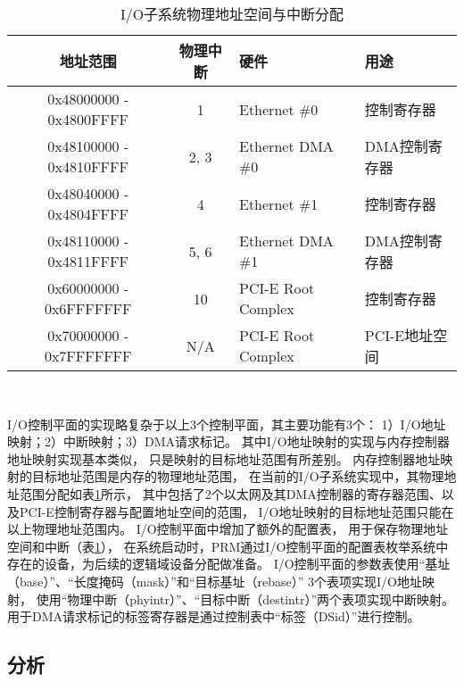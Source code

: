 \begin{table}[b]
  \centering
  \begin{minipage}[t]{0.9\linewidth}
  \caption{I/O子系统物理地址空间与中断分配}
  \label{tab:pard-io-phyconfig}
    \begin{tabular*}{\linewidth}{ccll}
      \toprule[1.5pt]
      \textbf{地址范围} & \textbf{物理中断} & \textbf{硬件} & \textbf{用途} \\
      \midrule[1pt]
      0x48000000 - 0x4800FFFF & 1    & Ethernet \#0       & 控制寄存器    \\
      0x48100000 - 0x4810FFFF & 2, 3 & Ethernet DMA \#0   & DMA控制寄存器 \\
      0x48040000 - 0x4804FFFF & 4    & Ethernet \#1       & 控制寄存器    \\
      0x48110000 - 0x4811FFFF & 5, 6 & Ethernet DMA \#1   & DMA控制寄存器 \\
      0x60000000 - 0x6FFFFFFF & 10   & PCI-E Root Complex & 控制寄存器    \\
      0x70000000 - 0x7FFFFFFF & N/A  & PCI-E Root Complex & PCI-E地址空间 \\
      \bottomrule[1.5pt]
    \end{tabular*}\\[2pt]
  \end{minipage}
\end{table}

I/O控制平面的实现略复杂于以上3个控制平面，其主要功能有3个：
1）I/O地址映射；2）中断映射；3）DMA请求标记。
其中I/O地址映射的实现与内存控制器地址映射实现基本类似，
只是映射的目标地址范围有所差别。
内存控制器地址映射的目标地址范围是内存的物理地址范围，
在当前的I/O子系统实现中，其物理地址范围分配如表\ref{tab:pard-io-phyconfig}所示，
其中包括了2个以太网及其DMA控制器的寄存器范围、以及PCI-E控制寄存器与配置地址空间的范围，
I/O地址映射的目标地址范围只能在以上物理地址范围内。
I/O控制平面中增加了额外的配置表，
用于保存物理地址空间和中断（表\ref{tab:pard-io-phyconfig}），
在系统启动时，PRM通过I/O控制平面的配置表枚举系统中存在的设备，为后续的逻辑域设备分配做准备。
I/O控制平面的参数表使用``基址（base）''、``长度掩码（mask）''和``目标基址（rebase）'' 3个表项实现I/O地址映射，
使用``物理中断（phyintr）''、``目标中断（destintr）''两个表项实现中断映射。
用于DMA请求标记的标签寄存器是通过控制表中``标签（DSid）''进行控制。


\subsection{分析}

